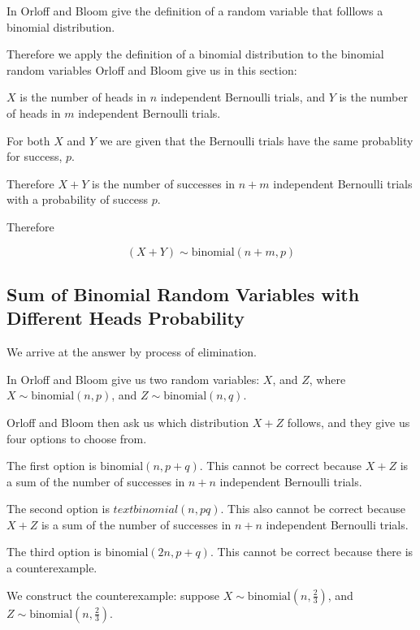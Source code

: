 \documentclass[a4paper,11pt]{article}
\begin{document}
In \cite{reading4} Orloff and Bloom give the definition of a random 
variable that folllows a binomial distribution.

Therefore we apply the definition of a binomial distribution to the
binomial random variables Orloff and Bloom give us in this section:

$X$ is the number of heads in $n$ independent Bernoulli trials, and $Y$
is the number of heads in $m$ independent Bernoulli trials.

For both $X$ and $Y$ we are given that the Bernoulli trials have the
same probablity for success, $p$.

Therefore $X+Y$ is the number of successes in $n+m$ independent
Bernoulli trials with a probability of success $p$.

Therefore 

\begin{equation}
  \left( X + Y \right) \sim \text{binomial} \left( n + m, p \right)
\end{equation}

\subsection{Sum of Binomial Random Variables with Different Heads 
  Probability}

We arrive at the answer by process of elimination. 

In \cite{slides4} Orloff and Bloom give us two random variables: $X$,
and $Z$, where $X \sim \text{binomial} \left( n, p \right)$, and
$Z \sim \text{binomial} \left( n, q \right)$.

Orloff and Bloom then ask us which distribution $X + Z$ follows, and
they give us four options to choose from.  

The first option is $\text{binomial} \left( n, p + q \right)$.  This 
cannot be correct because $X + Z$ is a sum of the number of successes in 
$n + n$ independent Bernoulli trials.

The second option is $text{binomial} \left( n, pq \right)$.  This also
cannot be correct because $X + Z$ is a sum of the number of successes in 
$n + n$ independent Bernoulli trials.

The third option is $\text{binomial} \left( 2n, p + q \right)$.  This
cannot be correct because there is a counterexample.

We construct the counterexample:  suppose 
$X \sim \text{binomial} \left( n, \frac{2}{3} \right)$, and
$Z \sim \text{binomial} \left( n, \frac{2}{3} \right)$.
\end{document}
